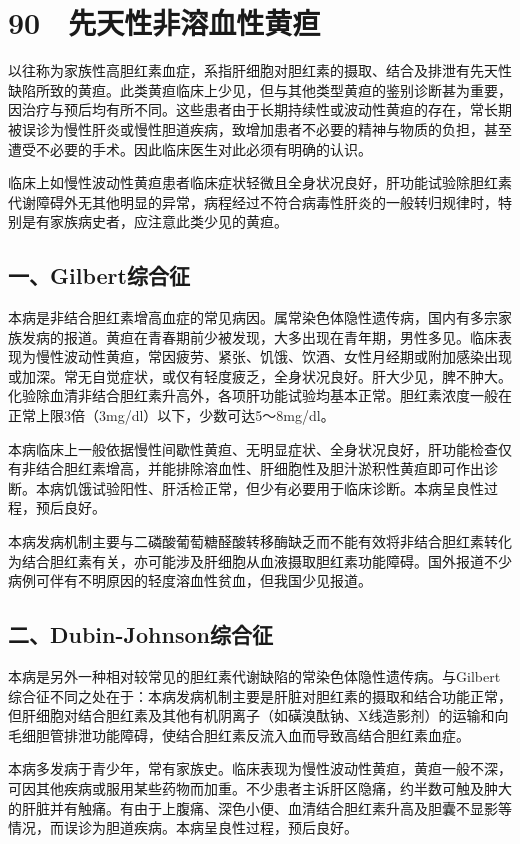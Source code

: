 \section{90　先天性非溶血性黄疸}

以往称为家族性高胆红素血症，系指肝细胞对胆红素的摄取、结合及排泄有先天性缺陷所致的黄疸。此类黄疸临床上少见，但与其他类型黄疸的鉴别诊断甚为重要，因治疗与预后均有所不同。这些患者由于长期持续性或波动性黄疸的存在，常长期被误诊为慢性肝炎或慢性胆道疾病，致增加患者不必要的精神与物质的负担，甚至遭受不必要的手术。因此临床医生对此必须有明确的认识。

临床上如慢性波动性黄疸患者临床症状轻微且全身状况良好，肝功能试验除胆红素代谢障碍外无其他明显的异常，病程经过不符合病毒性肝炎的一般转归规律时，特别是有家族病史者，应注意此类少见的黄疸。

\subsection{一、Gilbert综合征}

本病是非结合胆红素增高血症的常见病因。属常染色体隐性遗传病，国内有多宗家族发病的报道。黄疸在青春期前少被发现，大多出现在青年期，男性多见。临床表现为慢性波动性黄疸，常因疲劳、紧张、饥饿、饮酒、女性月经期或附加感染出现或加深。常无自觉症状，或仅有轻度疲乏，全身状况良好。肝大少见，脾不肿大。化验除血清非结合胆红素升高外，各项肝功能试验均基本正常。胆红素浓度一般在正常上限3倍（3mg/dl）以下，少数可达5～8mg/dl。

本病临床上一般依据慢性间歇性黄疸、无明显症状、全身状况良好，肝功能检查仅有非结合胆红素增高，并能排除溶血性、肝细胞性及胆汁淤积性黄疸即可作出诊断。本病饥饿试验阳性、肝活检正常，但少有必要用于临床诊断。本病呈良性过程，预后良好。

本病发病机制主要与二磷酸葡萄糖醛酸转移酶缺乏而不能有效将非结合胆红素转化为结合胆红素有关，亦可能涉及肝细胞从血液摄取胆红素功能障碍。国外报道不少病例可伴有不明原因的轻度溶血性贫血，但我国少见报道。

\subsection{二、Dubin-Johnson综合征}

本病是另外一种相对较常见的胆红素代谢缺陷的常染色体隐性遗传病。与Gilbert综合征不同之处在于：本病发病机制主要是肝脏对胆红素的摄取和结合功能正常，但肝细胞对结合胆红素及其他有机阴离子（如磺溴酞钠、X线造影剂）的运输和向毛细胆管排泄功能障碍，使结合胆红素反流入血而导致高结合胆红素血症。

本病多发病于青少年，常有家族史。临床表现为慢性波动性黄疸，黄疸一般不深，可因其他疾病或服用某些药物而加重。不少患者主诉肝区隐痛，约半数可触及肿大的肝脏并有触痛。有由于上腹痛、深色小便、血清结合胆红素升高及胆囊不显影等情况，而误诊为胆道疾病。本病呈良性过程，预后良好。

